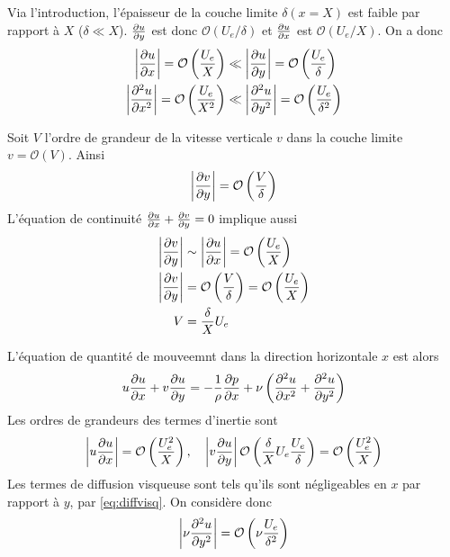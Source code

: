       Via l'introduction, l'épaisseur de la couche limite $\delta(x=X)$ est faible par rapport à $X$ ($\delta \ll X$). $\pdv{u}{y}$ est donc $\mathcal{O}(U_e/\delta)$ et $\pdv{u}{x}$ est $\mathcal{O}(U_e/X)$. On a donc
      \begin{equation}\label{eq:diffvisq}
        \begin{aligned}
          \left| \pdv{u}{x} \right| = \mathcal{O}\left(\frac{U_e}{X}\right) &\ll \left|\pdv{u}{y}\right| = \mathcal{O}\left(\frac{U_e}{\delta}\right)\\
          \left| \pdv[2]{u}{x} \right| = \mathcal{O}\left(\frac{U_e}{X^2}\right) &\ll \left|\pdv[2]{u}{y}\right| = \mathcal{O}\left(\frac{U_e}{\delta^2}\right)
        \end{aligned}
      \end{equation}

      Soit $V$ l'ordre de grandeur de la vitesse verticale $v$ dans la couche limite $v = \mathcal{O}(V)$. Ainsi
      \begin{equation}
        \left|\pdv{v}{y}\right| = \mathcal{O}\left(\frac{V}{\delta}\right)
      \end{equation}
      L'équation de continuité $\pdv{u}{x} + \pdv{v}{y} = 0$ implique aussi
      \begin{equation}
        \begin{aligned}
          \left|\pdv{v}{y}\right| &\sim \left| \pdv{u}{x} \right| = \mathcal{O} \left(\frac{U_e}{X}\right)\\
          \left|\pdv{v}{y}\right| &= \mathcal{O} \left(\frac{V}{\delta}\right) = \mathcal{O} \left(\frac{U_e}{X}\right)\\
          V &= \frac{\delta}{X} U_e
        \end{aligned}
      \end{equation}

      L'équation de quantité de mouveemnt dans la direction horizontale $x$ est alors
      \begin{equation}
        u\pdv{u}{x} + v\pdv{u}{y} = -\frac{1}{\rho} \pdv{p}{x} + \nu \left(\pdv[2]{u}{x} + \pdv[2]{u}{y}\right)
      \end{equation}
      Les ordres de grandeurs des termes d'inertie sont
      \begin{equation}
        \left|u \pdv{u}{x} \right| = \mathcal{O}\left(\frac{U_e^2}{X}\right), \quad \left|v\pdv{u}{y}\right| \mathcal{O}\left(\frac{\delta}{X} U_e \frac{U_e}{\delta}\right) = \mathcal{O}\left(\frac{U_e^2}{X}\right)
      \end{equation}
      Les termes de diffusion visqueuse sont tels qu'ils sont négligeables en $x$ par rapport à $y$, par \ref{eq:diffvisq}. On considère donc
      \begin{equation}
        \left|\nu \pdv[2]{u}{y}\right| = \mathcal{O}\left(\nu \frac{U_e}{\delta^2}\right)
      \end{equation}

